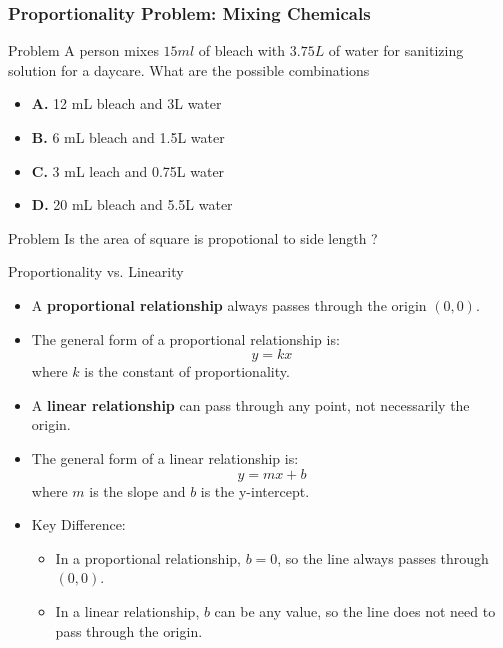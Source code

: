 \documentclass{beamer}
\begin{document}
\begin{frame}
    \frametitle{Proportionality Problem: Mixing Chemicals}

    \begin{block}{Problem}
        A person mixes $15 ml$ of bleach with $3.75 L$ of water for sanitizing solution for a daycare. What are the possible combinations 
    \end{block}

    \begin{itemize}
        \item \textbf{A.} 12 mL bleach and 3L water
        \item \textbf{B.} 6 mL bleach and 1.5L water
        \item \textbf{C.} 3 mL leach and 0.75L water
        \item \textbf{D.} 20 mL bleach and 5.5L water
    \end{itemize}
    \begin{block}{Problem}
        Is the area of square is propotional to side length ?
    \end{block}
\end{frame}

\begin{frame}{Proportionality vs. Linearity}
    \begin{itemize}
        \item A \textbf{proportional relationship} always passes through the origin \((0, 0)\).
        \item The general form of a proportional relationship is:
        \[
        y = kx
        \]
        where \(k\) is the constant of proportionality.
        
        \item A \textbf{linear relationship} can pass through any point, not necessarily the origin.
        \item The general form of a linear relationship is:
        \[
        y = mx + b
        \]
        where \(m\) is the slope and \(b\) is the y-intercept.
        
        \item Key Difference:
        \begin{itemize}
            \item In a proportional relationship, \(b = 0\), so the line always passes through \((0, 0)\).
            \item In a linear relationship, \(b\) can be any value, so the line does not need to pass through the origin.
        \end{itemize}
    \end{itemize}
\end{frame}
\end{document}

